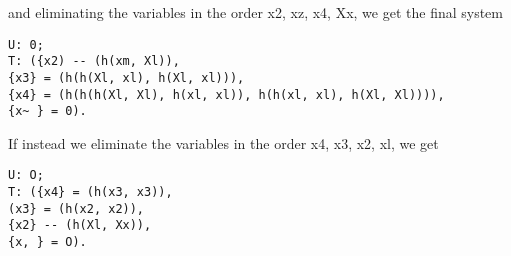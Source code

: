 and eliminating the variables in the order x2, xz, x4, Xx, we get the final system
\begin{verbatim}
U: 0;
T: ({x2) -- (h(xm, Xl)),
{x3} = (h(h(Xl, xl), h(Xl, xl))),
{x4} = (h(h(h(Xl, Xl), h(xl, xl)), h(h(xl, xl), h(Xl, Xl)))),
{x~ } = 0). 
\end{verbatim}

If instead we eliminate the variables in the order x4, x3, x2, xl, we get
\begin{verbatim}
U: O;
T: ({x4} = (h(x3, x3)),
(x3} = (h(x2, x2)),
{x2} -- (h(Xl, Xx)),
{x, } = O). 
\end{verbatim}
